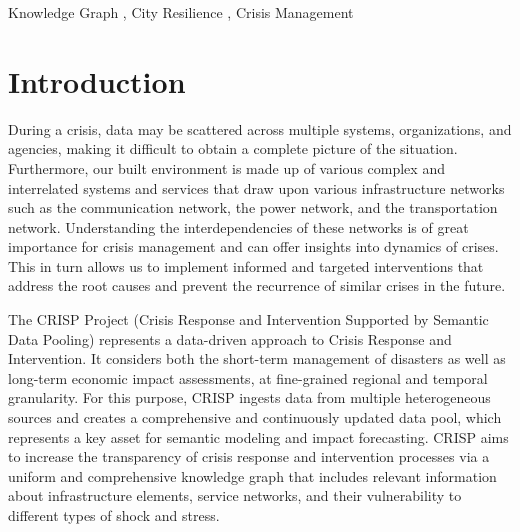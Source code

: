 \documentclass[
]{ceurart}
\begin{document}
\begin{keywords}
  Knowledge Graph \sep
  City Resilience \sep
  Crisis Management
\end{keywords}

\maketitle




\section{Introduction}

During a crisis, data may be scattered across multiple systems, organizations, and agencies, making it difficult to obtain a complete picture of the situation. Furthermore, our built environment is made up of various complex and interrelated systems and services that draw upon various infrastructure networks such as the communication network, the power network, and the transportation network. Understanding the interdependencies of these networks is of great importance for crisis management and can offer insights into dynamics of crises. This in turn allows us to implement informed and targeted interventions that address the root causes and prevent the recurrence of similar crises in the future.

The CRISP Project (Crisis Response and Intervention Supported by Semantic Data Pooling) represents a data-driven approach to Crisis Response and Intervention. It considers both the short-term management of disasters as well as long-term economic impact assessments, at fine-grained regional and temporal granularity. For this purpose, CRISP ingests data from multiple heterogeneous sources and creates a comprehensive and continuously updated data pool, which represents a key asset for semantic modeling and impact forecasting. CRISP aims to increase the transparency of crisis response and intervention processes via a uniform and comprehensive knowledge graph that includes relevant information about infrastructure elements, service networks, and their vulnerability to different types of shock and stress.
\end{document}
